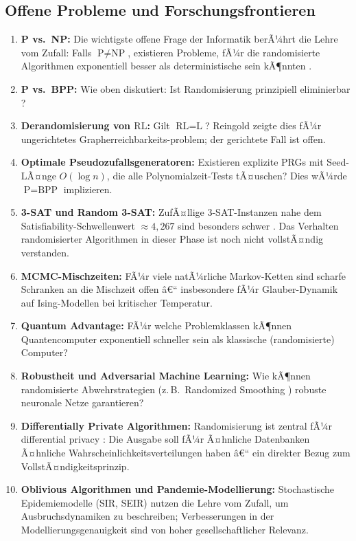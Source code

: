 ﻿\documentclass[12pt,a4paper]{article}
\theoremstyle{definition}
\theoremstyle{plain}
\theoremstyle{remark}
\begin{document}
\subsection{Offene Probleme und Forschungsfrontieren}

\begin{enumerate}[label=\textbf{\arabic*.}]
  \item \textbf{P vs.\ NP:} Die wichtigste offene Frage der Informatik
    berÃ¼hrt die Lehre vom Zufall: Falls $\text{P} \neq \text{NP}$, existieren
    Probleme, fÃ¼r die randomisierte Algorithmen exponentiell besser als
    deterministische sein kÃ¶nnten \cite{cook1971complexity}.
  \item \textbf{P vs.\ BPP:} Wie oben diskutiert: Ist Randomisierung
    prinzipiell eliminierbar \cite{impagliazzo1997p}?
  \item \textbf{Derandomisierung von $\text{RL}$:} Gilt
    $\text{RL} = \text{L}$? Reingold \cite{reingold2008undirected} zeigte
    dies fÃ¼r ungerichtetes Grapherreichbarkeits-problem; der gerichtete Fall
    ist offen.
  \item \textbf{Optimale Pseudozufallsgeneratoren:} Existieren explizite
    PRGs mit Seed-LÃ¤nge $O(\log n)$, die alle Polynomialzeit-Tests tÃ¤uschen?
    Dies wÃ¼rde $\text{P} = \text{BPP}$ implizieren.
  \item \textbf{3-SAT und Random 3-SAT:} ZufÃ¤llige 3-SAT-Instanzen nahe
    dem Satisfiability-Schwellenwert $\approx 4{,}267$ sind besonders schwer
    \cite{mertens2006threshold}. Das Verhalten randomisierter Algorithmen
    in dieser Phase ist noch nicht vollstÃ¤ndig verstanden.
  \item \textbf{MCMC-Mischzeiten:} FÃ¼r viele natÃ¼rliche Markov-Ketten
    sind scharfe Schranken an die Mischzeit offen â€“ insbesondere fÃ¼r
    Glauber-Dynamik auf Ising-Modellen bei kritischer Temperatur.
  \item \textbf{Quantum Advantage:} FÃ¼r welche Problemklassen kÃ¶nnen
    Quantencomputer exponentiell schneller sein als klassische
    (randomisierte) Computer?
  \item \textbf{Robustheit und Adversarial Machine Learning:} Wie kÃ¶nnen
    randomisierte Abwehrstrategien (z.\,B.\ Randomized Smoothing
    \cite{cohen2019certified}) robuste neuronale Netze garantieren?
  \item \textbf{Differentially Private Algorithmen:} Randomisierung ist
    zentral fÃ¼r differential privacy \cite{dwork2014algorithmic}:
    Die Ausgabe soll fÃ¼r Ã¤hnliche Datenbanken Ã¤hnliche Wahrscheinlichkeitsverteilungen
    haben â€“ ein direkter Bezug zum VollstÃ¤ndigkeitsprinzip.
  \item \textbf{Oblivious Algorithmen und Pandemie-Modellierung:}
    Stochastische Epidemiemodelle (SIR, SEIR) \cite{anderson1991infectious}
    nutzen die Lehre vom Zufall, um Ausbruchsdynamiken zu beschreiben;
    Verbesserungen in der Modellierungsgenauigkeit sind von hoher
    gesellschaftlicher Relevanz.
\end{enumerate}
\end{document}
